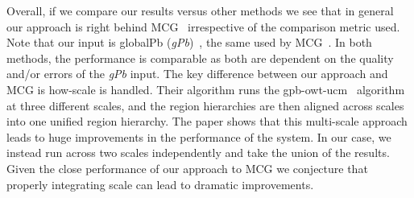 Overall, if we compare our results versus other methods we see that in general our approach is right behind MCG~\cite{Arbelaez:etal:CVPR14} irrespective of the comparison metric used. Note that our input is  globalPb ({\it gPb})~\cite{Maire:etal:CVPR08}, the same used by MCG~\cite{Arbelaez:etal:CVPR14}. In both methods, the performance is comparable as both are dependent on the quality and/or errors of the \emph{gPb} input. The key difference between our approach and MCG is how-scale is handled.  Their algorithm runs the gpb-owt-ucm~\cite{Arbelaez:etal:PAMI11} algorithm at three different scales, and the region hierarchies are then aligned across scales into one unified region hierarchy. The paper shows that this multi-scale approach leads to huge improvements in the performance of the system. In our case, we instead run across two scales independently and take the union of the results. Given the close performance of our approach to MCG we conjecture that properly integrating scale can lead to dramatic improvements. 





